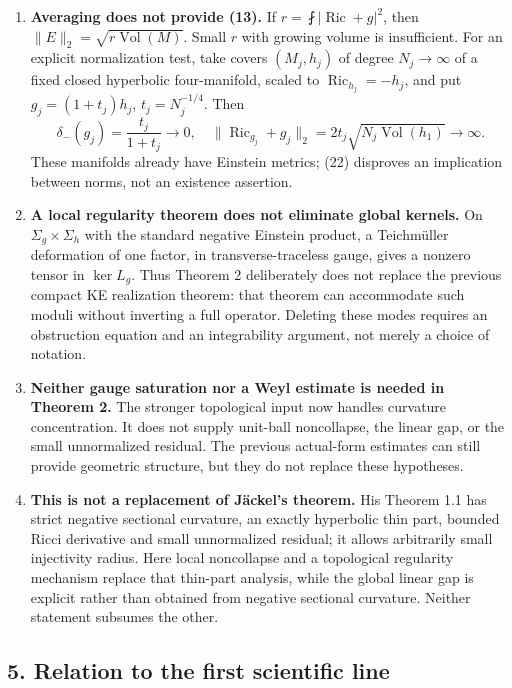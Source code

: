 \documentclass[
  11pt,
]{article}
\providecommand{\tightlist}{%
  \setlength{\itemsep}{0pt}\setlength{\parskip}{0pt}}
\begin{document}
\begin{enumerate}
\def\labelenumi{\arabic{enumi}.}
\tightlist
\item
  \textbf{Averaging does not provide (13).} If
  \(r=\fint|\operatorname{Ric}+g|^2\), then
  \(\|E\|_2=\sqrt{r\operatorname{Vol}(M)}\). Small \(r\) with growing
  volume is insufficient. For an explicit normalization test, take
  covers \((M_j,h_j)\) of degree \(N_j\to\infty\) of a fixed closed
  hyperbolic four-manifold, scaled to \(\operatorname{Ric}_{h_j}=-h_j\),
  and put \(g_j=(1+t_j)h_j\), \(t_j=N_j^{-1/4}\). Then \[
   \delta_-(g_j)=\frac{t_j}{1+t_j}\to0,
   \quad \|\operatorname{Ric}_{g_j}+g_j\|_2
      =2t_j\sqrt{N_j\operatorname{Vol}(h_1)}\to\infty.        \tag{22}
  \] These manifolds already have Einstein metrics; (22) disproves an
  implication between norms, not an existence assertion.
\item
  \textbf{A local regularity theorem does not eliminate global kernels.}
  On \(\Sigma_g\times\Sigma_h\) with the standard negative Einstein
  product, a Teichmüller deformation of one factor, in
  transverse-traceless gauge, gives a nonzero tensor in \(\ker L_g\).
  Thus Theorem 2 deliberately does not replace the previous compact KE
  realization theorem: that theorem can accommodate such moduli without
  inverting a full operator. Deleting these modes requires an
  obstruction equation and an integrability argument, not merely a
  choice of notation.
\item
  \textbf{Neither gauge saturation nor a Weyl estimate is needed in
  Theorem 2.} The stronger topological input now handles curvature
  concentration. It does not supply unit-ball noncollapse, the linear
  gap, or the small unnormalized residual. The previous actual-form
  estimates can still provide geometric structure, but they do not
  replace these hypotheses.
\item
  \textbf{This is not a replacement of Jäckel's theorem.} His Theorem
  1.1 has strict negative sectional curvature, an exactly hyperbolic
  thin part, bounded Ricci derivative and small unnormalized residual;
  it allows arbitrarily small injectivity radius. Here local noncollapse
  and a topological regularity mechanism replace that thin-part
  analysis, while the global linear gap is explicit rather than obtained
  from negative sectional curvature. Neither statement subsumes the
  other.
\end{enumerate}

\hypertarget{relation-to-the-first-scientific-line}{%
\subsection{5. Relation to the first scientific
line}\label{relation-to-the-first-scientific-line}}
\end{document}
